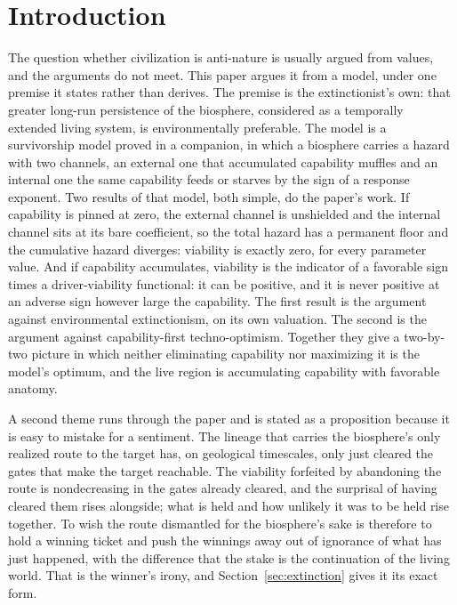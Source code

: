 \documentclass[11pt]{article}
\theoremstyle{plain}
\theoremstyle{definition}
\theoremstyle{remark}
\begin{document}
\section{Introduction}\label{sec:intro}

The question whether civilization is anti-nature is usually argued from
values, and the arguments do not meet. This paper argues it from a
model, under one premise it states rather than derives. The premise is
the extinctionist's own: that greater long-run persistence of the
biosphere, considered as a temporally extended living system, is
environmentally preferable. The model is a survivorship model proved in
a companion, in which a biosphere carries a hazard with two channels, an
external one that accumulated capability muffles and an internal one the
same capability feeds or starves by the sign of a response exponent. Two
results of that model, both simple, do the paper's work. If capability
is pinned at zero, the external channel is unshielded and the internal
channel sits at its bare coefficient, so the total hazard has a
permanent floor and the cumulative hazard diverges: viability is
exactly zero, for every parameter value. And if capability accumulates,
viability is the indicator of a favorable sign times a driver-viability
functional: it can be positive, and it is never positive at an adverse
sign however large the capability. The first result is the argument
against environmental extinctionism, on its own valuation. The second
is the argument against capability-first techno-optimism. Together they
give a two-by-two picture in which neither eliminating capability nor
maximizing it is the model's optimum, and the live region is
accumulating capability with favorable anatomy.

A second theme runs through the paper and is stated as a proposition
because it is easy to mistake for a sentiment. The lineage that carries
the biosphere's only realized route to the target has, on geological
timescales, only just cleared the gates that make the target reachable.
The viability forfeited by abandoning the route is nondecreasing in the
gates already cleared, and the surprisal of having cleared them rises
alongside; what is held and how unlikely it was to be held rise
together. To wish the route dismantled for the biosphere's sake is
therefore to hold a winning ticket and push the winnings away out of
ignorance of what has just happened, with the difference that the stake
is the continuation of the living world. That is the winner's irony,
and Section~\ref{sec:extinction} gives it its exact form.
\end{document}
